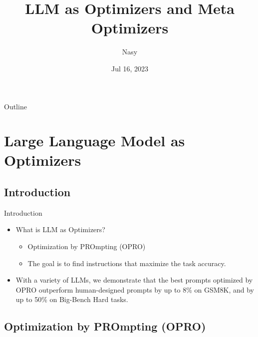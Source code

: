 \documentclass[aspectratio=1610,xcolor={dvipsnames},hyperref={colorlinks,unicode,linkcolor=violet,anchorcolor=BlueViolet,citecolor=YellowOrange,filecolor=black,urlcolor=Aquamarine}]{beamer}
\author{Nasy}
\date{Jul 16, 2023}
\title{LLM as Optimizers and Meta Optimizers}
\begin{document}
\maketitle
\begin{frame}{Outline}
\setcounter{tocdepth}{1}
\tableofcontents
\end{frame}

\setcounter{tocdepth}{2}
\section{Large Language Model as Optimizers}
\label{sec:org579998a}

\subsection{Introduction}
\label{sec:orgb8ef026}

\begin{frame}[label={sec:orge2c77d7}]{Introduction}
\begin{itemize}
\item What is LLM as Optimizers?
\begin{itemize}
\item Optimization by PROmpting (OPRO)
\item The goal is to find instructions that maximize the task accuracy.
\end{itemize}
\item With a variety of LLMs, we demonstrate that the best prompts optimized by OPRO outperform human-designed prompts by up to 8\% on GSM8K, and by up to 50\% on Big-Bench Hard tasks.
\end{itemize}
\end{frame}
\subsection{Optimization by PROmpting (OPRO)}
\label{sec:org639c87e}
\end{document}

